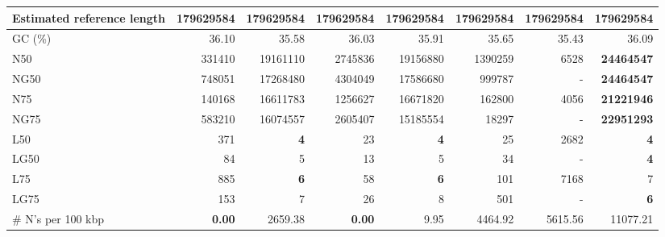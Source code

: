 \documentclass[12pt,a4paper]{article}
\begin{document}
\begin{table}[ht]
\begin{center}
\begin{tabular}{|l*{7}{|r}|}
Estimated reference length & 179629584 & 179629584 & 179629584 & 179629584 & 179629584 & 179629584 & 179629584 \\ \hline
GC (\%) & 36.10 & 35.58 & 36.03 & 35.91 & 35.65 & 35.43 & 36.09 \\ \hline
N50 & 331410 & 19161110 & 2745836 & 19156880 & 1390259 & 6528 & {\bf 24464547} \\ \hline
NG50 & 748051 & 17268480 & 4304049 & 17586680 & 999787 & - & {\bf 24464547} \\ \hline
N75 & 140168 & 16611783 & 1256627 & 16671820 & 162800 & 4056 & {\bf 21221946} \\ \hline
NG75 & 583210 & 16074557 & 2605407 & 15185554 & 18297 & - & {\bf 22951293} \\ \hline
L50 & 371 & {\bf 4} & 23 & {\bf 4} & 25 & 2682 & {\bf 4} \\ \hline
LG50 & 84 & 5 & 13 & 5 & 34 & - & {\bf 4} \\ \hline
L75 & 885 & {\bf 6} & 58 & {\bf 6} & 101 & 7168 & 7 \\ \hline
LG75 & 153 & 7 & 26 & 8 & 501 & - & {\bf 6} \\ \hline
\# N's per 100 kbp & {\bf 0.00} & 2659.38 & {\bf 0.00} & 9.95 & 4464.92 & 5615.56 & 11077.21 \\ \hline
\end{tabular}
\end{center}
\end{table}
\end{document}
